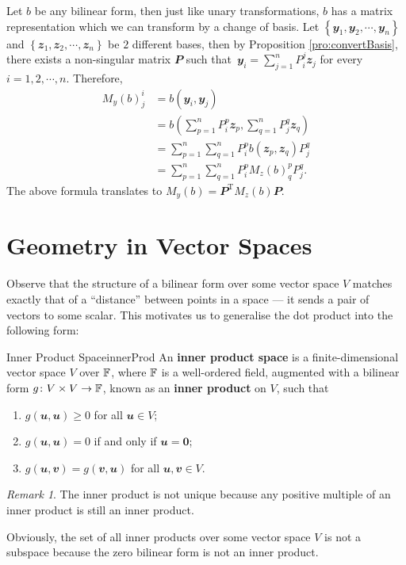 \documentclass[math, code]{amznotes}
\theoremstyle{remark}
\newtheorem*{remark}{Remark}
\newcommand{\zero}{\mathbf{0}}
\begin{document}
Let $b$ be any bilinear form, then just like unary transformations, $b$ has a matrix representation which we can transform by a change of basis. Let $\left\{\mathbfit{y}_1, \mathbfit{y}_2, \cdots, \mathbfit{y}_n\right\}$ and $\left\{\mathbfit{z}_1, \mathbfit{z}_2, \cdots, \mathbfit{z}_n\right\}$ be $2$ different bases, then by Proposition \ref{pro:convertBasis}, there exists a non-singular matrix $\mathbfit{P}$ such that~$\mathbfit{y}_i = \sum_{j = 1}^{n}P^j_i\mathbfit{z}_j$ for every $i = 1, 2, \cdots, n$. Therefore, 
\begin{align*}
    M_y(b)^i_j & = b\left(\mathbfit{y}_i, \mathbfit{y}_j\right) \\
    & = b\left(\sum_{p = 1}^{n}P^p_i\mathbfit{z}_p, \sum_{q = 1}^{n}P^q_j\mathbfit{z}_q\right) \\
    & = \sum_{p = 1}^{n}\sum_{q = 1}^{n}P^p_ib\left(\mathbfit{z}_p, \mathbfit{z}_q\right)P^q_j \\
    & = \sum_{p = 1}^{n}\sum_{q = 1}^{n}P^p_iM_z(b)^p_qP^q_j.
\end{align*}
The above formula translates to $M_y(b) = \mathbfit{P}^{\mathrm{T}}M_z(b)\mathbfit{P}$.
\section{Geometry in Vector Spaces}
Observe that the structure of a bilinear form over some vector space $V$ matches exactly that of a ``distance'' between points in a space --- it sends a pair of vectors to some scalar. This motivates us to generalise the dot product into the following form:
\begin{dfnbox}{Inner Product Space}{innerProd}
    An {\color{red} \textbf{inner product space}} is a finite-dimensional vector space $V$ over $\mathbb{F}$, where $\mathbb{F}$ is a well-ordered field, augmented with a bilinear form $g \colon V \times V \to \mathbb{F}$, known as an {\color{red} \textbf{inner product}} on $V$, such that
    \begin{enumerate}
        \item $g(\mathbfit{u}, \mathbfit{u}) \geq 0$ for all $\mathbfit{u} \in V$;
        \item $g(\mathbfit{u}, \mathbfit{u}) = 0$ if and only if $\mathbfit{u} = \zero$;
        \item $g(\mathbfit{u}, \mathbfit{v}) = g(\mathbfit{v}, \mathbfit{u})$ for all $\mathbfit{u}, \mathbfit{v} \in V$.
    \end{enumerate}
\end{dfnbox}
\begin{notebox}
    \begin{remark}
        The inner product is not unique because any positive multiple of an inner product is still an inner product.
    \end{remark}
\end{notebox}
Obviously, the set of all inner products over some vector space $V$ is not a subspace because the zero bilinear form is not an inner product.
\end{document}
